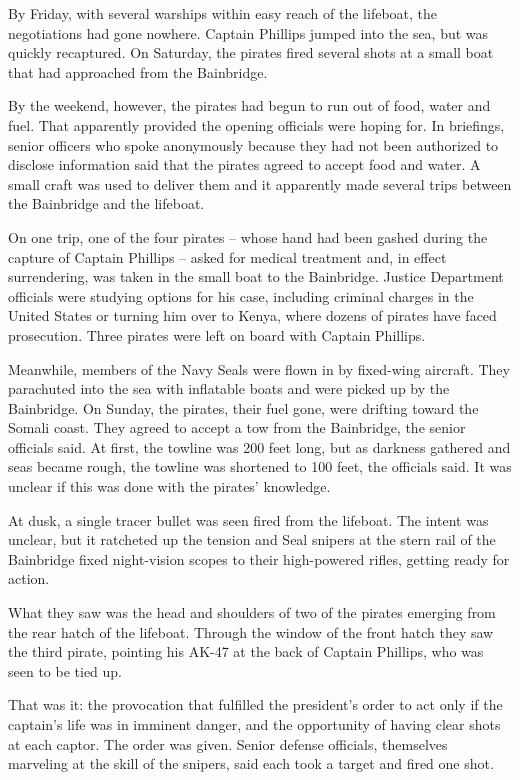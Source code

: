 \documentclass[12pt,a4paper,onecolumn]{article}
\begin{document}
By Friday, with several warships within easy reach of the lifeboat, the negotiations had gone
nowhere. Captain Phillips jumped into the sea, but was quickly recaptured. On Saturday, the pirates
fired several shots at a small boat that had approached from the Bainbridge.

By the weekend, however, the pirates had begun to run out of food, water and fuel. That apparently
provided the opening officials were hoping for. In briefings, senior officers who spoke anonymously
because they had not been authorized to disclose information said that the pirates agreed to accept
food and water. A small craft was used to deliver them and it apparently made several trips between
the Bainbridge and the lifeboat.

On one trip, one of the four pirates -- whose hand had been gashed during the capture of Captain
Phillips -- asked for medical treatment and, in effect surrendering, was taken in the small boat to
the Bainbridge. Justice Department officials were studying options for his case, including criminal
charges in the United States or turning him over to Kenya, where dozens of pirates have faced
prosecution. Three pirates were left on board with Captain Phillips.

Meanwhile, members of the Navy Seals were flown in by fixed-wing aircraft. They parachuted into the
sea with inflatable boats and were picked up by the Bainbridge. On Sunday, the pirates, their fuel
gone, were drifting toward the Somali coast. They agreed to accept a tow from the Bainbridge, the
senior officials said. At first, the towline was 200 feet long, but as darkness gathered and seas
became rough, the towline was shortened to 100 feet, the officials said. It was unclear if this was
done with the pirates' knowledge.

At dusk, a single tracer bullet was seen fired from the lifeboat. The intent was unclear, but it
ratcheted up the tension and Seal snipers at the stern rail of the Bainbridge fixed night-vision
scopes to their high-powered rifles, getting ready for action.

What they saw was the head and shoulders of two of the pirates emerging from the rear hatch of the
lifeboat. Through the window of the front hatch they saw the third pirate, pointing his AK-47 at the
back of Captain Phillips, who was seen to be tied up.

That was it: the provocation that fulfilled the president's order to act only if the captain's life
was in imminent danger, and the opportunity of having clear shots at each captor. The order was
given. Senior defense officials, themselves marveling at the skill of the snipers, said each took a
target and fired one shot.
\end{document}
